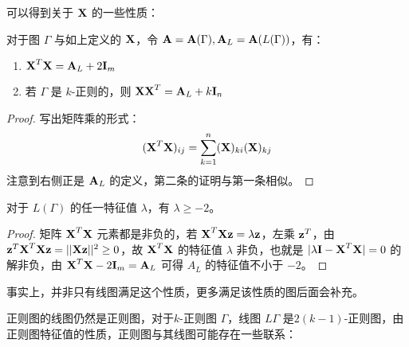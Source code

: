 可以得到关于 $\textbf X$ 的一些性质：

\begin{lemma}
对于图 $\Gamma$ 与如上定义的 $\textbf X$，令 $\textbf A = \textbf A(\Gamma), \textbf A_L = \textbf A(L(\Gamma))$，有：
\begin{enumerate}
\item $\textbf X^T\textbf X = \textbf A_L + 2\textbf I_m$
\item 若 $\Gamma$ 是 $k$-正则的，则 $\textbf X\textbf X^T = \textbf A_L + k\textbf I_n$
\end{enumerate}
\end{lemma}
\begin{proof}
写出矩阵乘的形式：
\[
(\textbf X^T\textbf X)_{ij} = \sum_{k = 1}^n (\textbf X)_{ki} (\textbf X)_{kj}
\]
注意到右侧正是 $\textbf A_L$ 的定义，第二条的证明与第一条相似。
\end{proof}

\begin{lemma}[线图特征值的下界]
对于 $L(\Gamma)$ 的任一特征值 $\lambda$，有 $\lambda \ge -2$。
\end{lemma}
\begin{proof}
矩阵 $\textbf X^T\textbf X$ 元素都是非负的，若 $\textbf X^T \textbf X \textbf z = \lambda \textbf z$，左乘 $\textbf z^T$，由 $\textbf z^T \textbf X^T \textbf X \textbf z = ||\textbf {Xz}||^2 \ge 0$，故 $\textbf X^T \textbf X$ 的特征值 $\lambda$ 非负，也就是 $|\lambda \textbf I - \textbf X^T\textbf X|=0$ 的解非负，由 $\textbf X^T\textbf X - 2\textbf I_m = \textbf A_L$ 可得 $A_L$ 的特征值不小于 $-2$。
\end{proof}

事实上，并非只有线图满足这个性质，更多满足该性质的图后面会补充。

正则图的线图仍然是正则图，对于$k$-正则图 $\Gamma$，线图 $L\Gamma$ 是$2(k-1)$-正则图，由正则图特征值的性质，正则图与其线图可能存在一些联系：

